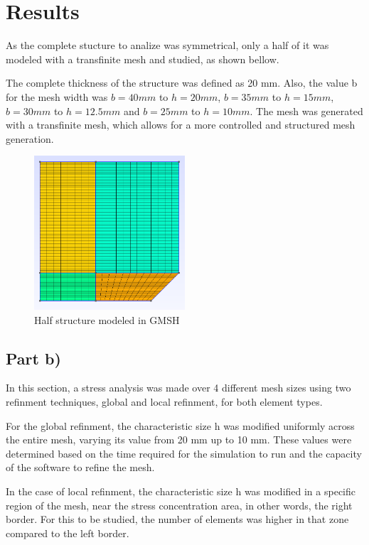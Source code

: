 \section{Results}

As the complete stucture to analize was symmetrical, only a half of it was modeled with a transfinite mesh and studied, as shown bellow.

The complete thickness of the structure was defined as 20 mm. Also, the value b for the mesh width was $b=40mm$ to $h=20mm$, $b=35mm$ to $h=15mm$, $b=30mm$ to $h=12.5mm$ and $b=25mm$ to $h=10mm$. The mesh was generated with a transfinite mesh, which allows for a more controlled and structured mesh generation.

\begin{figure}[H]
    \centering
    \includegraphics[width=0.5\textwidth]{img/geometria.png}
    \caption{Half structure modeled in GMSH}
    \label{fig:half_structure}
\end{figure}

\subsection{Part b)}

In this section, a stress analysis was made over 4 different mesh sizes using two refinment techniques, global and local refinment, for both element types.

For the global refinment, the characteristic size h was modified uniformly across the entire mesh, varying its value from 20 mm up to 10 mm. These values were determined based on the time required for the simulation to run and the capacity of the software to refine the mesh.

In the case of local refinment, the characteristic size h was modified in a specific region of the mesh, near the stress concentration area, in other words, the right border. For this to be studied, the number of elements was higher in that zone compared to the left border.

